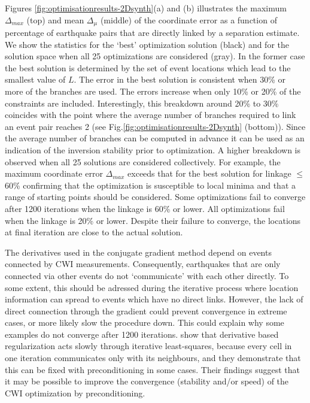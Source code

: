 \documentclass[12pt,double]{article}
\begin{document}
Figures \ref{fig:optimisationresults-2Dsynth}(a) and (b) illustrates
the maximum $\Delta_{max}$ (top) and mean $\Delta_\mu$ (middle) of
the coordinate error as a function of percentage of earthquake pairs
that are directly linked by a separation estimate. We show the
statistics for the `best' optimization solution (black) and for the
solution space when all 25 optimizations are considered (gray). In
the former case the best solution is determined by the set of event
locations which lead to the smallest value of $L$. The error in the
best solution is consistent when 30\% or more of the branches are
used. The errors increase when only 10\% or 20\% of the constraints
are included. Interestingly, this breakdown around 20\% to 30\%
coincides with the point where the average number of branches
required to link an event pair reaches 2 (see
Fig.\ref{fig:optimisationresults-2Dsynth} (bottom)). Since the
average number of branches can be computed in advance it can be used
as an indication of the inversion stability prior to optimization. A
higher breakdown is observed when all 25 solutions are considered
collectively. For example, the maximum coordinate error
$\Delta_{max}$ exceeds that for the best solution for linkage
$\leq$60\% confirming that the optimization is susceptible to local
minima and that a range of starting points should be considered.
Some optimizations fail to converge after 1200 iterations when the
linkage is 60\% or lower. All optimizations fail when the linkage is
20\% or lower. Despite their failure to converge, the locations at
final iteration are close to the actual solution.

The derivatives used in the conjugate gradient method depend on
events connected by CWI measurements. Consequently, earthquakes that
are only connected via other events do not `communicate' with each
other directly. To some extent, this should be adressed during the
iterative process where location information can spread to events
which have no direct links. However, the lack of direct connection
through the gradient could prevent convergence in extreme cases, or
more likely slow the procedure down. This could explain why some
examples do not converge after 1200 iterations.
\citet{dr_VanDecar94a} show that derivative based regularization acts slowly
through iterative least-squares, because
 every cell in one iteration communicates only with its neighbours, and they demonstrate that this can be
fixed with preconditioning in some cases. Their findings suggest
that it may be possible to improve the convergence (stability and/or
speed) of the CWI optimization by preconditioning.
\end{document}
